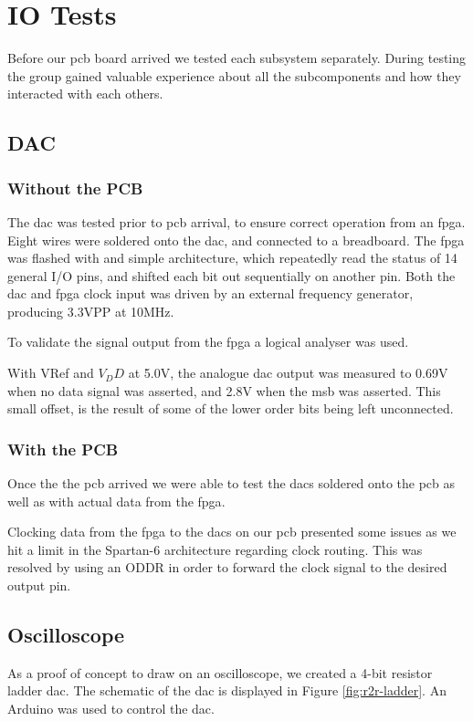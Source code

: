 \section{IO Tests}
Before our \gls{pcb} board arrived we tested each subsystem separately.
During testing the group gained valuable experience about all the subcomponents and how they interacted with each others.

\subsection{DAC}

\subsubsection{Without the PCB}

The \gls{dac} was tested prior to \gls{pcb} arrival, to ensure correct operation from an \gls{fpga}.
Eight wires were soldered onto the \gls{dac}, and connected to a breadboard.
The \gls{fpga} was flashed with and simple architecture, which repeatedly read the status of 14 general I/O pins, and shifted each bit out sequentially on another pin.
Both the \gls{dac} and \gls{fpga} clock input was driven by an external frequency generator, producing 3.3VPP at 10MHz.

To validate the signal output from the \gls{fpga} a logical analyser was used.

With VRef and \(V_DD\) at 5.0V, the analogue \gls{dac} output was measured to 0.69V when no data signal was asserted, and 2.8V when the \gls{msb} was asserted. This small offset, is the result of some of the lower order bits being left unconnected.

\subsubsection{With the PCB}

Once the the \gls{pcb} arrived we were able to test the \gls{dac}s soldered onto the \gls{pcb} as well as with actual data from the \gls{fpga}.

Clocking data from the \gls{fpga} to the \gls{dac}s on our \gls{pcb} presented some issues as we hit a limit in the Spartan-6 architecture regarding clock routing. This was resolved by using an ODDR\cite[pp. 61--65]{fpga-io} in order to forward the clock signal to the desired output pin.


\subsection{Oscilloscope}
As a proof of concept to draw on an oscilloscope, we created a 4-bit resistor ladder \gls{dac}. The schematic of the \gls{dac} is displayed in Figure \ref{fig:r2r-ladder}.
An Arduino was used to control the \gls{dac}.

